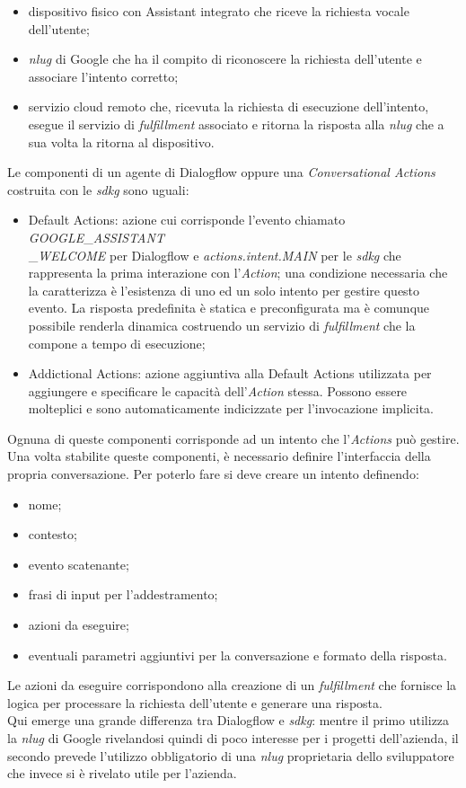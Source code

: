 		\begin{itemize}
			\item dispositivo fisico con Assistant integrato che riceve la richiesta vocale dell'utente;
			\item \emph{\gls{nlug}} di Google che ha il compito di riconoscere la richiesta dell'utente e associare l'intento corretto;
			\item servizio cloud remoto che, ricevuta la richiesta di esecuzione dell'intento, esegue il servizio di \emph{fulfillment} associato e ritorna la risposta alla \emph{\gls{nlug}} che a sua volta la ritorna al dispositivo.
		\end{itemize}
		Le componenti di un agente di Dialogflow oppure una \emph{Conversational Actions} costruita con le \emph{\gls{sdkg}} sono uguali:
		\begin{itemize}
			\item Default Actions: azione cui corrisponde l'evento chiamato \textit{GOOGLE}\_\textit{ASSISTANT}\\ \_\textit{WELCOME} per Dialogflow e \textit{actions.intent.MAIN} per le \emph{\gls{sdkg}} che rappresenta la prima interazione con l'\emph{Action}; una condizione necessaria che la caratterizza è l'esistenza di uno ed un solo intento per gestire questo evento. La risposta predefinita è statica e preconfigurata ma è comunque possibile renderla dinamica costruendo un servizio di \emph{fulfillment} che la compone a tempo di esecuzione;
			\item Addictional Actions: azione aggiuntiva alla Default Actions utilizzata per aggiungere e specificare le capacità dell'\emph{Action} stessa. Possono essere molteplici e sono automaticamente indicizzate per l'invocazione implicita.
		\end{itemize}
		Ognuna di queste componenti corrisponde ad un intento che l'\emph{Actions} può gestire. \\
		Una volta stabilite queste componenti, è necessario definire l'interfaccia della propria conversazione. Per poterlo fare si deve creare un intento definendo:
		\begin{itemize}
			\item nome;
			\item contesto;
			\item evento scatenante;
			\item frasi di input per l'addestramento;
			\item azioni da eseguire;
			\item eventuali parametri aggiuntivi per la conversazione e formato della risposta.
		\end{itemize}
		Le azioni da eseguire corrispondono alla creazione di un \emph{fulfillment} che fornisce la logica per processare la richiesta dell'utente e generare una risposta. \\
		Qui emerge una grande differenza tra Dialogflow e \emph{\gls{sdkg}}: mentre il primo utilizza la \emph{\gls{nlug}} di Google rivelandosi quindi di poco interesse per i progetti dell'azienda, il secondo prevede l'utilizzo obbligatorio di una \emph{\gls{nlug}} proprietaria dello sviluppatore che invece si è rivelato utile per l'azienda.
